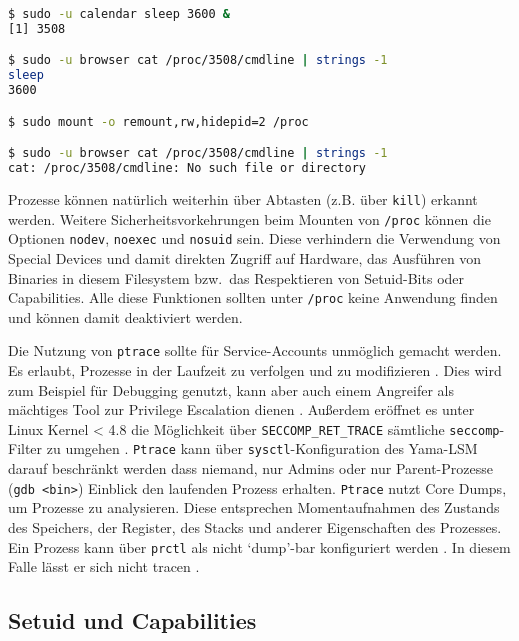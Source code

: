 \begin{lstlisting}[language=bash]
$ sudo -u calendar sleep 3600 &
[1] 3508

$ sudo -u browser cat /proc/3508/cmdline | strings -1
sleep
3600

$ sudo mount -o remount,rw,hidepid=2 /proc

$ sudo -u browser cat /proc/3508/cmdline | strings -1
cat: /proc/3508/cmdline: No such file or directory
\end{lstlisting}

Prozesse können natürlich weiterhin über Abtasten (z.B. über \texttt{kill}) erkannt werden. Weitere Sicherheitsvorkehrungen beim Mounten von \texttt{/proc} können die Optionen \texttt{nodev}, \texttt{noexec} und \texttt{nosuid} sein. Diese verhindern die Verwendung von Special Devices und damit direkten Zugriff auf Hardware, das Ausführen von Binaries in diesem Filesystem bzw.\ das Respektieren von Setuid-Bits oder Capabilities. Alle diese Funktionen sollten unter \texttt{/proc} keine Anwendung finden und können damit deaktiviert werden.

Die Nutzung von \texttt{ptrace} sollte für Service-Accounts unmöglich gemacht werden. Es erlaubt, Prozesse in der Laufzeit zu verfolgen und zu modifizieren \cite{man-ptrace}. Dies wird zum Beispiel für Debugging genutzt, kann aber auch einem Angreifer als mächtiges Tool zur Privilege Escalation dienen \cite{attack-process-injection}.
Außerdem eröffnet es unter Linux Kernel < 4.8 die Möglichkeit über \texttt{SECCOMP\_RET\_TRACE} sämtliche \texttt{seccomp}-Filter zu umgehen \cite{ptrace-seccomp-bypass}.
\texttt{Ptrace} kann über \texttt{sysctl}-Konfiguration des Yama-LSM darauf beschränkt werden dass niemand, nur Admins oder nur Parent-Prozesse (\texttt{gdb <bin>}) Einblick den laufenden Prozess erhalten. \texttt{Ptrace} nutzt Core Dumps, um Prozesse zu analysieren. Diese entsprechen Momentaufnahmen des Zustands des Speichers, der Register, des Stacks und anderer Eigenschaften des Prozesses. Ein Prozess kann über \texttt{prctl} als nicht `dump'-bar konfiguriert werden \cite{man-proc}. In diesem
Falle lässt er sich nicht tracen \cite{man-ptrace}.


\subsection{Setuid und Capabilities}

